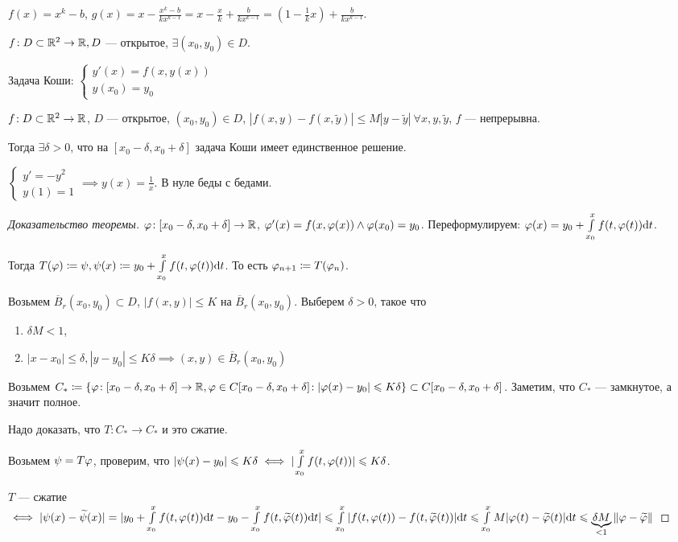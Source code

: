\begin{remark}
    $f(x) = x^k - b$,  $g(x) = x - \frac{x^k - b}{kx^{k-1}} = x - \frac{x}{k} + \frac{b}{kx^{k-1}} = (1-\frac{1}{k}x)+\frac{b}{kx^{k-1}}$.
\end{remark}
\begin{definition}
    $f\!: D \subset \mathbb{R}^2 \to \mathbb{R}, D$ --- открытое, $\exists (x_0, y_0) \in D$.

     Задача Коши: $
\begin{cases}
    y'(x) = f(x, y(x))\\
    y(x_0) = y_0
\end{cases}
     $
\end{definition}
\begin{theorem}[Пикара]
    $f\!: D \subset \mathbb{R}^2 \to \mathbb{R}$,  $D$ --- открытое,  $(x_0, y_0) \in D$, $|f(x, y) - f(x, \widetilde{y})| \le M |y-\widetilde{y}|\ \forall x, y, \widetilde{y}$, $f$ --- непрерывна.

    Тогда  $\exists \delta > 0$, что на  $[x_0 - \delta, x_0 + \delta]$ задача Коши имеет единственное решение.
\end{theorem}
\begin{remark}
    $\begin{cases} y' = -y^2\\y(1) = 1 \end{cases} \implies y(x) = \frac{1}{x}$. В нуле беды с бедами.
\end{remark}
\begin{proof}[Доказательство теоремы]
    $\varphi\!: [x_0-\delta, x_0 + \delta] \to \mathbb{R}$,  $\varphi'(x) = f(x, \varphi(x)) \land \varphi(x_0) = y_0$. Переформулируем: $\varphi(x) = y_0 + \int\limits_{x_0}^x f(t, \varphi(t)) \mathrm{d}t$.

    Тогда $T(\varphi) \coloneqq \psi, \psi(x) \coloneqq y_0 + \int\limits_{x_0}^x f(t, \varphi(t)) \mathrm{d}t$. То есть $\varphi_{n+1} \coloneqq T(\varphi_n)$.

    Возьмем  $\overline{B}_r(x_0, y_0) \subset D$,  $|f(x, y)| \le K$ на $\overline{B}_r(x_0, y_0)$. Выберем $\delta > 0$, такое что 
    \begin{enumerate}
        \item $\delta M < 1$,
        \item  $|x - x_0| \le \delta, |y-y_0| \le K\delta \implies (x, y) \in \overline{B}_r(x_0, y_0)$
    \end{enumerate}
    Возьмем $C_* \coloneqq \{ \varphi\!: [x_0 -\delta, x_0 + \delta] \to \mathbb{R}, \varphi \in C[x_0 - \delta, x_0 + \delta]\!: |\varphi(x) - y_0| \leqslant K\delta\} \subset C[x_0-\delta, x_0 + \delta]$. Заметим, что $C_*$ --- замкнутое, а значит полное.

    Надо доказать, что $T\!: C_* \to C_*$ и это сжатие.

    Возьмем $\psi = T\varphi$, проверим, что $|\psi(x) - y_0| \leqslant K\delta \iff |\int\limits_{x_0}^x f(t, \varphi(t))| \leqslant K\delta$.

    $T$ --- сжатие  $ \iff |\psi(x) - \widetilde{\psi}(x)| = |y_0 + \int\limits_{x_0}^x f(t, \varphi(t))\mathrm{d}t - y_0 -\int\limits_{x_0}^x f(t, \widetilde{\varphi}(t)) \mathrm{d}t| \leqslant \int\limits_{x_0}^x |f(t, \varphi(t)) - f(t, \widetilde{\varphi}(t))| \mathrm{d}t \leqslant \int\limits_{x_0}^x M|\varphi(t) - \widetilde{\varphi}(t)|\mathrm{d}t \leqslant \underbrace{\delta M}_{< 1} \|\varphi - \widetilde{\varphi}\|$
\end{proof}
